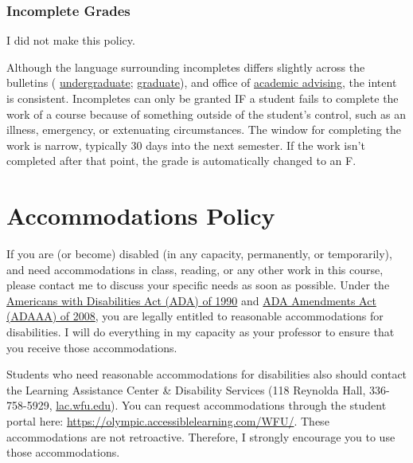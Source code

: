 \documentclass[
]{book}
\begin{document}
\hypertarget{incomplete-grades}{%
\subsection{Incomplete Grades}\label{incomplete-grades}}

I did not make this policy.

Although the language surrounding incompletes differs slightly across the bulletins ( \href{https://bulletin.wfu.edu/undergraduate/procedures/exams-grading/\#:~:text=Incomplete\%20Grade}{undergraduate}; \href{https://bulletin.wfu.edu/graduate/procedures/grading/\#:~:text=Grade\%20of\%20I}{graduate}), and office of \href{https://advising.wfu.edu/academic-challenges/incompletes/}{academic advising}, the intent is consistent.
Incompletes can only be granted IF a student fails to complete the work of a course because of something outside of the student's control, such as an illness, emergency, or extenuating circumstances. The window for completing the work is narrow, typically 30 days into the next semester. If the work isn't completed after that point, the grade is automatically changed to an F.

\hypertarget{accommodations-policy}{%
\chapter{Accommodations Policy}\label{accommodations-policy}}

If you are (or become) disabled (in any capacity, permanently, or temporarily), and need accommodations in class, reading, or any other work in this course, please contact me to discuss your specific needs as soon as possible.
Under the \href{https://www.dol.gov/general/topic/disability/ada}{Americans with Disabilities Act (ADA) of 1990} and \href{https://en.wikipedia.org/wiki/ADA_Amendments_Act_of_2008}{ADA Amendments Act (ADAAA) of 2008}, you are legally entitled to reasonable accommodations for disabilities.
I will do everything in my capacity as your professor to ensure that you receive those accommodations.

Students who need reasonable accommodations for disabilities also should contact the Learning Assistance Center \& Disability Services (118 Reynolda Hall, 336-758-5929, \href{https://lac.wfu.edu/}{lac.wfu.edu}). You can request accommodations through the student portal here: \url{https://olympic.accessiblelearning.com/WFU/}. These accommodations are not retroactive. Therefore, I strongly encourage you to use those accommodations.
\end{document}
